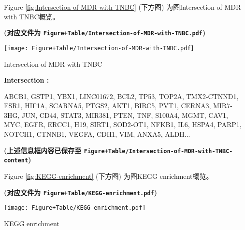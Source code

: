 \documentclass[
]{article}
\begin{document}
\begin{center}\vspace{1.5cm}\end{center}

Figure \ref{fig:Intersection-of-MDR-with-TNBC} (下方图) 为图Intersection of MDR with TNBC概览。

\textbf{(对应文件为 \texttt{Figure+Table/Intersection-of-MDR-with-TNBC.pdf})}

\def\@captype{figure}
\begin{center}
\texttt{[image: Figure+Table/Intersection-of-MDR-with-TNBC.pdf]}
\caption{Intersection of MDR with TNBC}\label{fig:Intersection-of-MDR-with-TNBC}
\end{center}

\begin{center}\vspace{1.5cm}\end{center}\begin{center}\begin{tcolorbox}[colback=gray!10, colframe=gray!50, width=0.9\linewidth, arc=1mm, boxrule=0.5pt]
\textbf{
Intersection
:}

\vspace{0.5em}

    ABCB1, GSTP1, YBX1, LINC01672, BCL2, TP53, TOP2A,
TMX2-CTNND1, ESR1, HIF1A, SCARNA5, PTGS2, AKT1, BIRC5,
PVT1, CERNA3, MIR7-3HG, JUN, CD44, STAT3, MIR381, PTEN,
TNF, S100A4, MGMT, CAV1, MYC, EGFR, ERCC1, H19, SIRT1,
SOD2-OT1, NFKB1, IL6, HSPA4, PARP1, NOTCH1, CTNNB1, VEGFA,
CDH1, VIM, ANXA5, ALDH...

\vspace{2em}
\end{tcolorbox}
\end{center}

\textbf{(上述信息框内容已保存至 \texttt{Figure+Table/Intersection-of-MDR-with-TNBC-content})}

\begin{center}\vspace{1.5cm}\end{center}

Figure \ref{fig:KEGG-enrichment} (下方图) 为图KEGG enrichment概览。

\textbf{(对应文件为 \texttt{Figure+Table/KEGG-enrichment.pdf})}

\def\@captype{figure}
\begin{center}
\texttt{[image: Figure+Table/KEGG-enrichment.pdf]}
\caption{KEGG enrichment}\label{fig:KEGG-enrichment}
\end{center}
\end{document}
